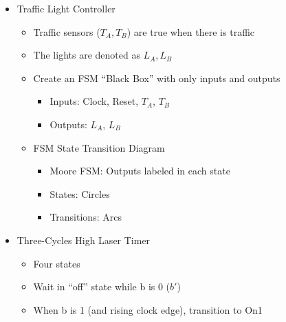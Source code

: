 \begin{itemize}

  \item Traffic Light Controller

    \begin{itemize}

      \item Traffic sensors ($T_A,T_B$) are true when there is traffic

      \item The lights are denoted as $L_A,L_B$

      \item Create an FSM ``Black Box'' with only inputs and outputs

        \begin{itemize}

          \item Inputs: Clock, Reset, $T_A$, $T_B$

          \item Outputs: $L_A$, $L_B$

        \end{itemize}

      \item FSM State Transition Diagram

        \begin{itemize}

          \item Moore FSM: Outputs labeled in each state

          \item States: Circles

          \item Transitions: Arcs

        \end{itemize}

    \end{itemize}

  \item Three-Cycles High Laser Timer

    \begin{itemize}

      \item Four states

      \item Wait in ``off'' state while b is 0 ($b'$)

      \item When b is 1 (and rising clock edge), transition to On1


\end{itemize}
\end{itemize}
